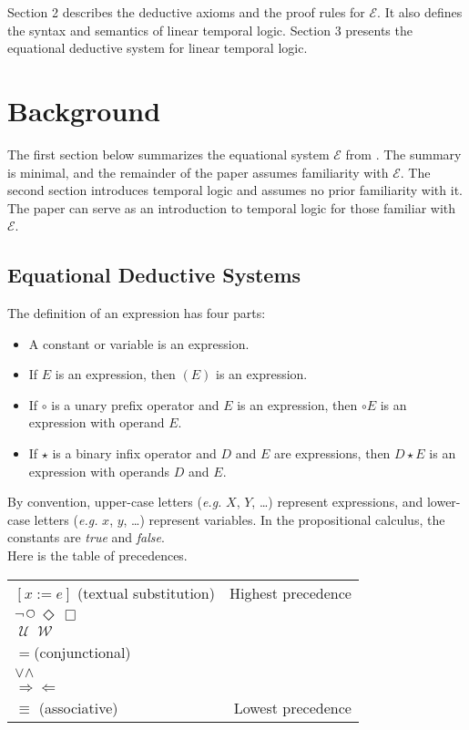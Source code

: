 \documentclass[fleqn, leqno]{article}
\newcommand{\llgap}{6pt} %
\newcommand{\impl}{\ensuremath{\Rightarrow}} %
\newcommand{\foll}{\ensuremath{\Leftarrow}} %
\newcommand{\Until}{\;\mathcal{U}\;}
\newcommand{\Wait}{\;\mathcal{W}\;}
\newcommand{\Next}{\;\,\text{\raisebox{3.5pt}{\circle{6}}}}
\newcommand{\Event}{\Diamond\,}
\newcommand{\Always}{\Box\,}
\begin{document}
Section 2 describes the deductive axioms and the proof rules for $\mathcal{E}$.
It also defines the syntax and semantics of linear temporal logic.
Section 3 presents the equational deductive system for linear temporal logic.\\

\section{Background}

The first section below summarizes the equational system $\mathcal{E}$ from \cite{LADM}.
The summary is minimal, and the remainder of the paper assumes familiarity with $\mathcal{E}$.
The second section introduces temporal logic and assumes no prior familiarity with it.
The paper can serve as an introduction to temporal logic for those familiar with $\mathcal{E}$.

\subsection{Equational Deductive Systems}

The definition of an expression has four parts:
\begin{itemize}[$\bullet$]
\item A constant or variable is an expression.
\item If $E$ is an expression, then $(E)$ is an expression.
\item If $\circ$ is a unary prefix operator and $E$ is an expression, then $\circ E$ is an expression with operand $E$.
\item If $\star$ is a binary infix operator and $D$ and $E$ are expressions, then $D \star E$ is an expression with operands $D$
and $E$.
\end{itemize}

By convention, upper-case letters ({\itshape e.g.\/} $X$, $Y$, \dots) represent expressions,
and lower-case letters ({\itshape e.g.\/} $x$, $y$, \dots) represent variables.
In the propositional calculus, the constants are {\itshape true\/} and {\itshape false\/}.\\

Here is the table of precedences.\\

\setlength\extrarowheight{2pt}
\begin{tabular}{lr}
\hline
$[x := e]$ (textual substitution) & Highest precedence\\
$\lnot$\quad $\Next$\quad $\Event$\quad $\Always$ &\\
$\Until$\quad $\Wait$ &\\
$=$\quad (conjunctional) &\\
$\lor$\quad $\land$ &\\
$\impl$\quad $\foll$ &\\
$\equiv$ \quad (associative) & Lowest precedence\\
\hline
\end{tabular}\\[\llgap]
\end{document}
